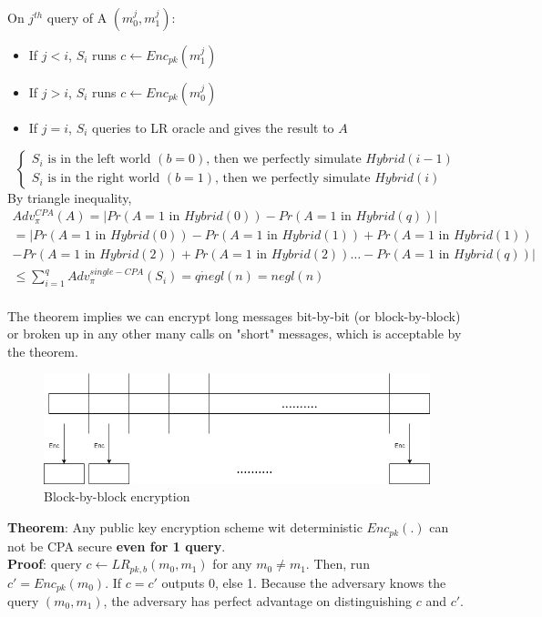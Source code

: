 \documentclass{scribe}
\begin{document}
On $j^{th}$ query of A $(m_0^j,m_1^j)$:
\begin{itemize}
    \item If $j<i$, $S_i$ runs $c \leftarrow Enc_{pk}(m_1^j)$
    \item If $j>i$, $S_i$ runs $c \leftarrow Enc_{pk}(m_0^j)$
    \item If $j=i$, $S_i$ queries to LR oracle and gives the result to $A$
\end{itemize}
\begin{equation}
\begin{cases}
    S_i\text{ is in the left world }(b=0)\text{, then we perfectly simulate }Hybrid(i-1) \\
    S_i\text{ is in the right world }(b=1)\text{, then we perfectly simulate }Hybrid(i)
\end{cases}
\end{equation}
By triangle inequality,
\begin{multline*}
Adv_{\pi}^{CPA}(A) = \big|Pr(A=1\text{ in } Hybrid(0)) - Pr(A=1\text{ in } Hybrid(q)) \big|\\
= \big|Pr(A=1\text{ in } Hybrid(0)) - Pr(A=1\text{ in } Hybrid(1)) + Pr(A=1\text{ in } Hybrid(1)) \\
-Pr(A=1\text{ in } Hybrid(2)) + Pr(A=1\text{ in } Hybrid(2)) \dots -Pr(A=1\text{ in } Hybrid(q)) \big|\\
\le \sum_{i=1}^{q} Adv_{\pi}^{single-CPA}(S_i) = q \dot negl(n) = negl(n)
\end{multline*}
\\
The theorem implies we can encrypt long messages bit-by-bit (or block-by-block) or broken up in any other many calls on "short" messages, which is acceptable by the theorem.
\\
\begin{figure}[H]
    \centering
    \includegraphics[scale=0.2]{second.jpg}
    \caption{Block-by-block encryption}
\end{figure}
\vspace{5mm}

\textbf{Theorem}: Any public key encryption scheme wit deterministic $Enc_{pk}(.)$ can not be CPA secure \textbf{even for 1 query}.
\\
\textbf{Proof}: query $c \leftarrow LR_{pk,b}(m_0,m_1)$ for any $m_0 \neq m_1$. Then, run $c' = Enc_{pk}(m_0)$. If $c=c'$ outputs 0, else 1. Because the adversary knows the query $(m_0,m_1)$, the adversary has perfect advantage on distinguishing $c$ and $c'$.
\end{document}
